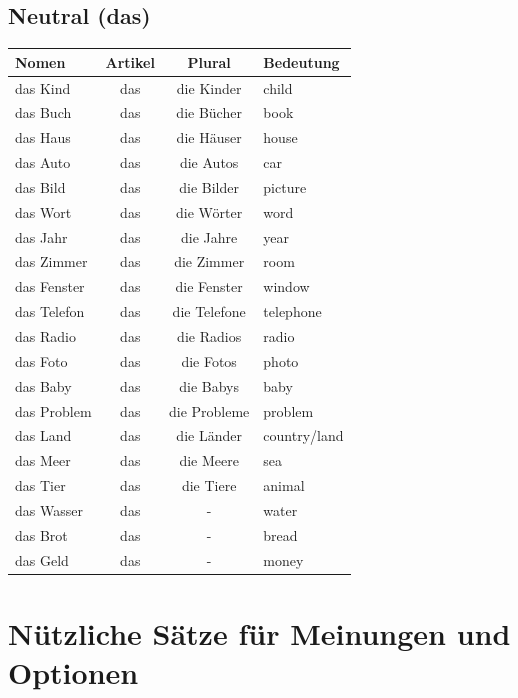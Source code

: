 \subsection{Neutral (das)}
\begin{center}
\begin{tabular}{|l|c|c|l|}
\hline
\textbf{Nomen} & \textbf{Artikel} & \textbf{Plural} & \textbf{Bedeutung} \\ \hline
das Kind & das & die Kinder & child \\ \hline
das Buch & das & die Bücher & book \\ \hline
das Haus & das & die Häuser & house \\ \hline
das Auto & das & die Autos & car \\ \hline
das Bild & das & die Bilder & picture \\ \hline
das Wort & das & die Wörter & word \\ \hline
das Jahr & das & die Jahre & year \\ \hline
das Zimmer & das & die Zimmer & room \\ \hline
das Fenster & das & die Fenster & window \\ \hline
das Telefon & das & die Telefone & telephone \\ \hline
das Radio & das & die Radios & radio \\ \hline
das Foto & das & die Fotos & photo \\ \hline
das Baby & das & die Babys & baby \\ \hline
das Problem & das & die Probleme & problem \\ \hline
das Land & das & die Länder & country/land \\ \hline
das Meer & das & die Meere & sea \\ \hline
das Tier & das & die Tiere & animal \\ \hline
das Wasser & das & - & water \\ \hline
das Brot & das & - & bread \\ \hline
das Geld & das & - & money \\ \hline
\end{tabular}
\end{center}

\section{Nützliche Sätze für Meinungen und Optionen}
\label{sec:Meinungen}

